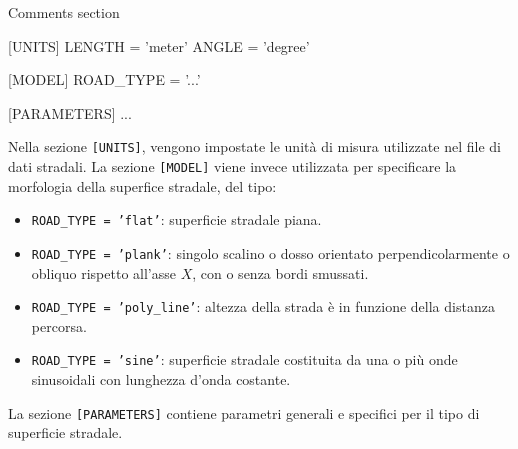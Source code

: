 \begin{pseudoc}
	{ Comments section }
	
	[UNITS]
	LENGTH = 'meter'
	ANGLE = 'degree'
	
	[MODEL]
	ROAD\_TYPE = '...'
	
	[PARAMETERS]
	...
\end{pseudoc}

Nella sezione \texttt{[UNITS]}, vengono impostate le unità di misura utilizzate nel file di dati stradali. La sezione \texttt{[MODEL]} viene invece utilizzata per specificare la morfologia della superfice stradale, del tipo:
\begin{itemize}
	\item \texttt{ROAD\_TYPE = 'flat'}: superficie stradale piana.
	\item \texttt{ROAD\_TYPE = 'plank'}: singolo scalino o dosso orientato perpendicolarmente o obliquo rispetto all'asse $X$, con o senza bordi smussati.
	\item \texttt{ROAD\_TYPE = 'poly\_line'}: altezza della strada è in funzione della distanza percorsa.
	\item \texttt{ROAD\_TYPE = 'sine'}: superficie stradale costituita da una o più onde sinusoidali con lunghezza d'onda costante.
\end{itemize}
La sezione \texttt{[PARAMETERS]} contiene parametri generali e specifici per il tipo di superficie stradale.

